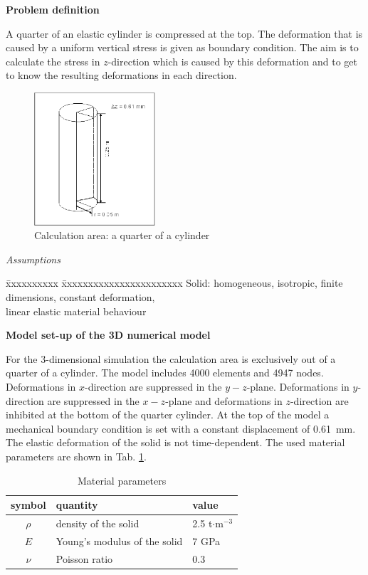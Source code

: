 
\textbf{Problem definition}

A quarter of an elastic cylinder is compressed at the top. The deformation that is caused by a uniform vertical stress is given as boundary condition. The aim is to calculate the stress in $z$-direction which is caused by this deformation and to get to know the resulting deformations in each direction.

\begin{figure}[htbp]
\centering
\includegraphics[width=0.4\textwidth]{M/figures/fig31.eps}
\caption{Calculation area: a quarter of a cylinder}
\label{fig31}
\end{figure}


\textsl{Assumptions}

\begin{tabbing}
\=xxxxxxxxxx  \=xxxxxxxxxxxxxxxxxxxxxxx \kill
\> Solid: \> homogeneous, isotropic, finite dimensions, constant deformation, \\
\> \> linear elastic material behaviour
\end{tabbing}

\textbf{Model set-up of the 3D numerical model}

For the 3-dimensional simulation the calculation area is exclusively out of a quarter of a cylinder. The model includes 4000 elements and 4947 nodes. Deformations in $x$-direction are suppressed in the $y-z$-plane. Deformations in $y$-direction are suppressed in the $x-z$-plane and deformations in $z$-direction are inhibited at the bottom of the quarter cylinder. At the top of the model a mechanical boundary condition is set with a constant displacement of 0.61~mm. The elastic deformation of the solid is not time-dependent. The used material parameters are shown in Tab. \ref{tab33}.
\begin{table}[htbp]
\centering
\begin{tabular}{|c|l|l|}
\hline
symbol & quantity & value \\
\hline
$\rho$  & density of the solid &  2.5 t$\cdot$m$^{-3}$  \\			
\hline
$E$ & Young's modulus of the solid & 7 GPa \\
\hline
$\nu$ & Poisson ratio & 0.3 \\
\hline
\end{tabular}
\caption{Material parameters}
\label{tab33}
\end{table}


